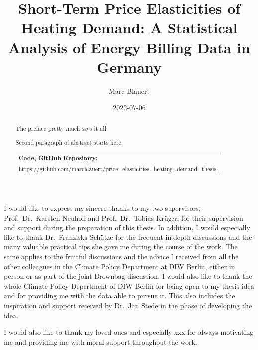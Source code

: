 \documentclass[12pt,twoside]{reedthesis}
\title{Short-Term Price Elasticities of Heating Demand: A Statistical Analysis of Energy Billing Data in Germany}
\author{Marc Blauert}
\date{2022-07-06}
\begin{document}
  \maketitle

\frontmatter %
\pagestyle{empty} %
  \begin{acknowledgements}
    I would like to express my sincere thanks to my two supervisors, Prof.~Dr.~Karsten Neuhoff and Prof.~Dr.~Tobias Krüger, for their supervision and support during the preparation of this thesis. In addition, I would especially like to thank Dr.~Franziska Schütze for the frequent in-depth discussions and the many valuable practical tips she gave me during the course of the work. The same applies to the fruitful discussions and the advice I received from all the other colleagues in the Climate Policy Department at DIW Berlin, either in person or as part of the joint Brownbag discussion. I would also like to thank the whole Climate Policy Department of DIW Berlin for being open to my thesis idea and for providing me with the data able to pursue it. This also includes the inspiration and support received by Dr.~Jan Stede in the phase of developing the idea.

    \par
    \bigskip

    I would also like to thank my loved ones and especially xxx for always motivating me and providing me with moral support throughout the work.
  \end{acknowledgements}

  \hypersetup{linkcolor=black}
  \setcounter{secnumdepth}{2}
  \setcounter{tocdepth}{2}
  \tableofcontents

  \listoftables

  \listoffigures
  \begin{abstract}
    The preface pretty much says it all.

    \par

    Second paragraph of abstract starts here.

    \bigskip \bigskip \noindent
    \begin{tabular}{m{14cm}} \hline \textbf{Code, GitHub Repository:}                                                            \\ \footnotesize \url{https://github.com/marcblauert/price_elasticities_heating_demand_thesis}    \\ \hline \end{tabular}
  \end{abstract}
\end{document}
